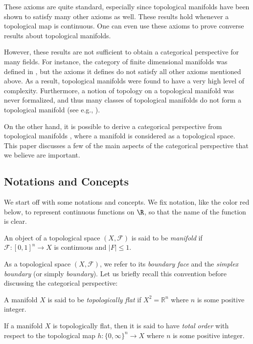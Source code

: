 \documentclass[a4paper,reqno,oneside]{article}
\begin{document}
These axioms are quite standard, especially since topological manifolds have been shown to satisfy many other axioms as well. These results hold whenever a topological map is continuous. One can even use these axioms to prove converse results about topological manifolds. 

However, these results are not sufficient to obtain a categorical perspective for many fields. For instance, the category of finite dimensional manifolds was defined in \cite{Kriz_2016}, but the axioms it defines do not satisfy all other axioms mentioned above. As a result, topological manifolds were found to have a very high level of complexity. Furthermore, a notion of topology on a topological manifold was never formalized, and thus many classes of topological manifolds do not form a topological manifold (see e.g., \cite{Johnson-Freyd_2013}). 

On the other hand, it is possible to derive a categorical perspective from topological manifolds \cite{ToposSpaceCategories}, where a manifold is considered as a topological space. This paper discusses a few of the main aspects of the categorical perspective that we believe are important. 

\subsection*{Notations and Concepts} 
We start off with some notations and concepts. We fix notation, like the color red below, to represent continuous functions on $\R$, so that the name of the function is clear. 


\begin{definition}[A manifold]
    An object of a topological space $(X,\mathcal{F})$ is said to be \emph{manifold} if $\mathcal{F}: [0,1]^{n} \to X$ is continuous and $|F| \le 1$.
\end{definition}

As a topological space $(X,\mathcal{F})$, we refer to its \emph{boundary face} and the \emph{simplex boundary} (or simply \emph{boundary}). Let us briefly recall this convention before discussing the categorical perspective: 

\begin{lemma} 
    A manifold $X$ is said to be \emph{topologically flat} if $X^2 = \mathbb{R}^n$ where $n$ is some positive integer.
\end{lemma}

\begin{lemma} 
    If a manifold $X$ is topologically flat, then it is said to have \emph{total order} with respect to the topological map $h: \{0,\infty\}^n \to X$ where $n$ is some positive integer.  
\end{lemma}
\end{document}
